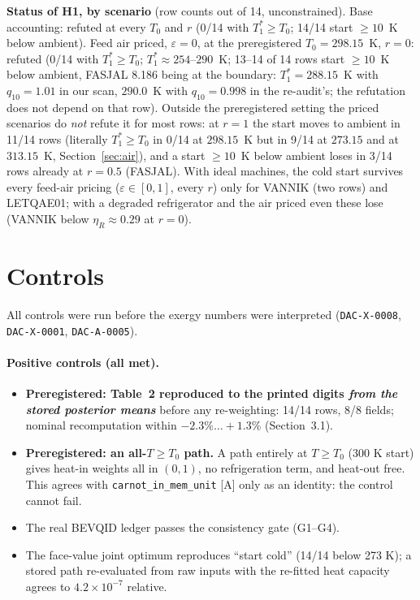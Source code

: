 \documentclass[10pt]{article}
\newcommand{\tier}[1]{\textsf{[#1]}}
\newcommand{\tA}{\tier{A}}
\newcommand{\lean}[1]{\texttt{#1}}
\newcommand{\id}[1]{\texttt{DAC-#1}}
\begin{document}
\textbf{Status of H1, by scenario} (row counts out of 14, unconstrained). Base accounting: refuted at every $T_0$ and $r$ (0/14 with $T_1^\ast\ge T_0$; 14/14 start $\ge10$~K below ambient). Feed air priced, $\varepsilon=0$, at the preregistered $T_0=298.15$~K, $r=0$: refuted (0/14 with $T_1^\ast\ge T_0$; $T_1^\ast\approx254$--$290$~K; 13--14 of 14 rows start $\ge10$~K below ambient, FASJAL 8.186 being at the boundary: $T_1^\ast=288.15$~K with $q_{10}=1.01$ in our scan, $290.0$~K with $q_{10}=0.998$ in the re-audit's; the refutation does not depend on that row). Outside the preregistered setting the priced scenarios do \emph{not} refute it for most rows: at $r=1$ the start moves to ambient in 11/14 rows (literally $T_1^\ast\ge T_0$ in 0/14 at $298.15$~K but in 9/14 at $273.15$ and at $313.15$~K, Section~\ref{sec:air}), and a start $\ge10$~K below ambient loses in 3/14 rows already at $r=0.5$ (FASJAL). With ideal machines, the cold start survives every feed-air pricing ($\varepsilon\in[0,1]$, every $r$) only for VANNIK (two rows) and LETQAE01; with a degraded refrigerator and the air priced even these lose (VANNIK below $\eta_R\approx0.29$ at $r=0$).

\section{Controls}\label{sec:controls}
All controls were run before the exergy numbers were interpreted (\id{X-0008}, \id{X-0001}, \id{A-0005}).
\paragraph{Positive controls (all met).}
\begin{itemize}\itemsep=0pt
\item \textbf{Preregistered: Table~2 reproduced to the printed digits \emph{from the stored posterior means}} before any re-weighting: 14/14 rows, 8/8 fields; nominal recomputation within $-2.3\%\ldots+1.3\%$ (Section~3.1).
\item \textbf{Preregistered: an all-$T\ge T_0$ path.} A path entirely at $T\ge T_0$ (300 K start) gives heat-in weights all in $(0,1)$, no refrigeration term, and heat-out free. This agrees with \lean{carnot\_in\_mem\_unit} \tA{} only as an identity: the control cannot fail.
\item The real BEVQID ledger passes the consistency gate (G1--G4).
\item The face-value joint optimum reproduces ``start cold'' (14/14 below 273 K); a stored path re-evaluated from raw inputs with the re-fitted heat capacity agrees to $4.2\times10^{-7}$ relative.
\end{itemize}
\end{document}
